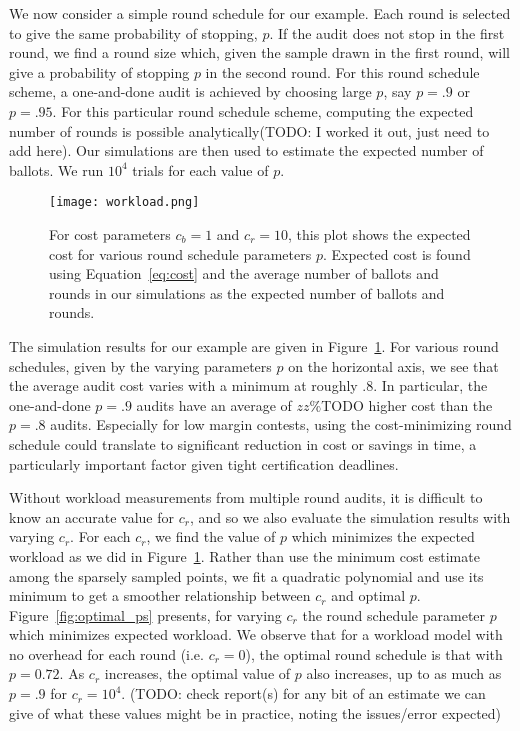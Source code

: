 We now consider a simple round schedule for our example. Each round is selected to give the same probability of stopping, $p$. If the audit does not stop in the first round, we find a round size which, given the sample drawn in the first round, will give a probability of stopping $p$ in the second round. For this round schedule scheme, a one-and-done audit is achieved by choosing large $p$, say $p=.9$ or $p=.95$. For this particular round schedule scheme, computing the expected number of rounds is possible analytically(TODO: I worked it out, just need to add here). Our simulations are then used to estimate the expected number of ballots.
We run $10^4$ trials for each value of $p$.

\begin{figure}
\texttt{[image: workload.png]}
\caption{For cost parameters $c_b=1$ and $c_r=10$, this plot shows the expected cost for various round schedule parameters $p$. Expected cost is found using Equation~\ref{eq:cost} and the average number of ballots and rounds in our simulations as the expected number of ballots and rounds.}
\label{fig:workload}
\end{figure}

The simulation results for our example are given in Figure~\ref{fig:workload}. 
For various round schedules, given by the varying parameters $p$ on the horizontal axis, we see that the average audit cost varies with a minimum at roughly $.8$. In particular, the one-and-done $p=.9$ audits have an average of $zz\%$TODO higher cost than the $p=.8$ audits. Especially for low margin contests, using the cost-minimizing round schedule could translate to significant reduction in cost or savings in time, a particularly important factor given tight certification deadlines.

Without workload measurements from multiple round audits, it is difficult to know an accurate value for $c_r$, and so we also evaluate the simulation results with varying $c_r$. 
For each $c_r$, we find the value of $p$ which minimizes the expected workload as we did in Figure~\ref{fig:workload}. Rather than use the minimum cost estimate among the sparsely sampled points, we fit a quadratic polynomial and use its minimum to get a smoother relationship between $c_r$ and optimal $p$. Figure~\ref{fig:optimal_ps} presents, for varying $c_r$ the round schedule parameter $p$ which minimizes expected workload. 
We observe that for a workload model with no overhead for each round (i.e. $c_r=0$), the optimal round schedule is that with $p=0.72$. As $c_r$ increases, the optimal value of $p$ also increases, up to as much as $p=.9$ for $c_r=10^4$.
(TODO: check report(s) for any bit of an estimate we can give of what these values might be in practice, noting the issues/error expected)


